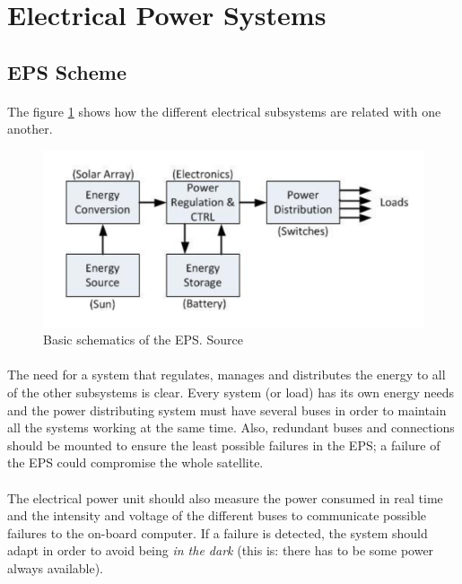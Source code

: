 \section{Electrical Power Systems}
\subsection{EPS Scheme}

\paragraph{}The figure \ref{epsbasics} shows how the different electrical subsystems are related with one another.

\begin{figure}[h]
\includegraphics[scale=0.6]{./sections/SatelliteDept/sections/images/epsbasics}
\centering
\caption{Basic schematics of the EPS. Source \cite{epsbasics}} 
\label{epsbasics}
\end{figure}

\paragraph{}The need for a system that regulates, manages and distributes the energy to all of the other subsystems is clear. Every system (or load) has its own energy needs and the power distributing system must have several buses in order to maintain all the systems working at the same time. Also, redundant buses and connections should be mounted to ensure the least possible failures in the EPS; a failure of the EPS could compromise the whole satellite.

\paragraph{}The electrical power unit should also measure the power consumed in real time and the intensity and voltage of the different buses to communicate possible failures to the on-board computer. If a failure is detected, the system should adapt in order to avoid being \textit{in the dark} (this is: there has to be some power always available).

